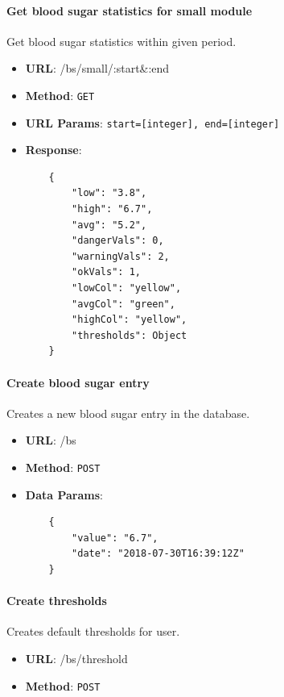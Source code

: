         \paragraph{Get blood sugar statistics for small module} Get blood sugar statistics within given period.
        \begin{itemize}
            \item \textbf{URL}: /bs/small/:start\&:end
            \item \textbf{Method}: \texttt{GET}
            \item \textbf{URL Params}: \texttt{start=[integer], end=[integer]}
            \item \textbf{Response}: \begin{verbatim}
    {
        "low": "3.8",
        "high": "6.7",
        "avg": "5.2",
        "dangerVals": 0,
        "warningVals": 2,
        "okVals": 1,
        "lowCol": "yellow",
        "avgCol": "green",
        "highCol": "yellow",
        "thresholds": Object
    }
            \end{verbatim}
        \end{itemize}

        \paragraph{Create blood sugar entry} Creates a new blood sugar entry in the database.
        \begin{itemize}
            \item \textbf{URL}: /bs
            \item \textbf{Method}: \texttt{POST}
            \item \textbf{Data Params}: \begin{verbatim}
    {
        "value": "6.7",
        "date": "2018-07-30T16:39:12Z"
    }   
            \end{verbatim}
        \end{itemize}

        \paragraph{Create thresholds} Creates default thresholds for user.
        \begin{itemize}
            \item \textbf{URL}: /bs/threshold
            \item \textbf{Method}: \texttt{POST}
        \end{itemize}

